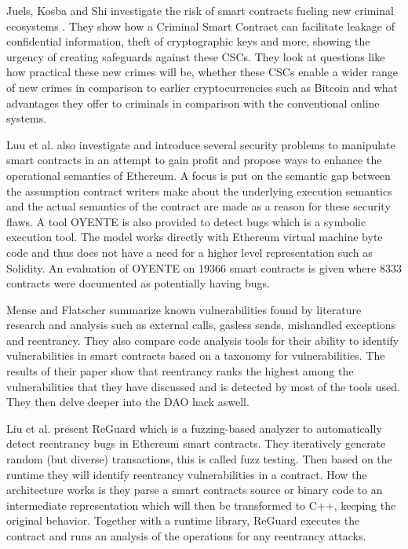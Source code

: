 \documentclass[sigconf]{acmart}
\begin{document}
Juels, Kosba and Shi\cite{criminal} investigate the risk of smart contracts fueling new criminal ecosystems . They show how a Criminal Smart Contract can facilitate leakage of confidential information, theft of cryptographic keys and more, showing the urgency of creating safeguards against these CSCs. They look at questions like how practical these new crimes will be, whether these CSCs enable a wider range of new crimes in comparison to earlier cryptocurrencies such as Bitcoin and what advantages they offer to criminals in comparison with the conventional online systems. 


Luu et al.  \cite{smarter} also investigate and introduce several security problems to manipulate smart contracts in an attempt to gain profit and propose ways to enhance the operational semantics of Ethereum. A focus is put on the semantic gap between the assumption contract writers make about the underlying execution semantics and the actual semantics of the contract are made as a reason for these security flaws. A tool OYENTE is also provided to detect bugs which is a symbolic execution tool. The model works directly with Ethereum virtual machine byte code and thus does not have a need for a higher level representation such as Solidity. An evaluation of OYENTE on 19366 smart contracts is given where 8333 contracts were documented as potentially having bugs.

Mense and Flatscher \cite{security} summarize known vulnerabilities found by literature research and analysis such as external calls, gasless sends, mishandled exceptions and reentrancy. They also compare code analysis tools for their ability to identify vulnerabilities in smart contracts based on a taxonomy for vulnerabilities. The results of their paper show that reentrancy ranks the highest among the vulnerabilities that they have discussed and is detected by most of the tools used. They then delve deeper into the DAO hack aswell. 


Liu et al. \cite{reguard} present ReGuard which is a fuzzing-based analyzer to automatically detect reentrancy bugs in Ethereum smart contracts. They iteratively generate random (but diverse) transactions, this is called fuzz testing. Then based on the runtime they will identify reentrancy vulnerabilities in a contract. How the architecture works is they parse a smart contracts source or binary code to an intermediate representation which will then be transformed to C++, keeping the original behavior. Together with a runtime library, ReGuard executes the contract and runs an analysis of the operations for any reentrancy attacks.
\end{document}

